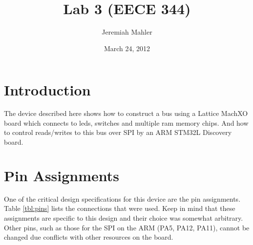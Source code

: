 \documentclass{article}
\begin{document}

\title{Lab 3 (EECE 344)}
\date{March 24, 2012}
\author{Jeremiah Mahler}

\maketitle

\tableofcontents

\pagebreak

\section{Introduction}

The device described here shows how to construct a bus
using a Lattice MachXO\cite{EB66} board which connects
to leds, switches and multiple ram memory chips.
And how to control reads/writes to this bus
over SPI by an ARM STM32L Discovery\cite{UM1079} board.


\section{Pin Assignments}
\label{sec:pa}

One of the critical design specifications for this device are
the pin assignments.
Table \ref{tbl:pins} lists the connections that were used.
Keep in mind that these assignments are specific to this
design and their choice was somewhat arbitrary.
Other pins, such as those for the SPI on the ARM (PA5, PA12, PA11),
cannot be changed due conflicts with other resources on the board.
\end{document}
